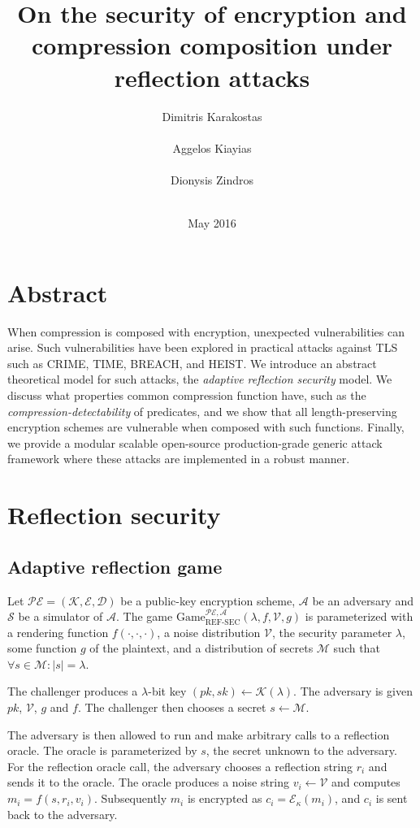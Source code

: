 \documentclass{sig-alternate-05-2015}
\title{On the security of encryption and compression composition under reflection attacks}
\author{
\alignauthor
Dimitris Karakostas\\
       \affaddr{University of Athens}\\
       \email{dimit.karakostas@gmail.com}
\alignauthor
Aggelos Kiayias\\
       \affaddr{University of Athens}\\
       \email{aggelos@di.uoa.gr}
\alignauthor
Dionysis Zindros\\
       \affaddr{University of Athens}\\
       \email{dionyziz@di.uoa.gr}
}
\date{May 2016}
\begin{document}
\maketitle

\section{Abstract}\label{sec:abstract}
When compression is composed with encryption, unexpected vulnerabilities can
arise. Such vulnerabilities have been explored in practical attacks against TLS
such as CRIME, TIME, BREACH, and HEIST. We introduce an abstract theoretical
model for such attacks, the \textit{adaptive reflection security} model. We
discuss what properties common compression function have, such as the
\textit{compression-detectability} of predicates, and we show that all
length-preserving encryption schemes are vulnerable when composed with such
functions. Finally, we provide a modular scalable open-source production-grade
generic attack framework where these attacks are implemented in a robust
manner.

\section{Reflection security}\label{sec:refsec}

\subsection{Adaptive reflection game}\label{subsec:refsecgame}

Let $\mathcal{PE} = (\mathcal{K}, \mathcal{E}, \mathcal{D})$ be a public-key
encryption scheme, $\mathcal{A}$ be an adversary and $\mathcal{S}$ be a
simulator of $\mathcal{A}$.  The game
$\text{Game}_{\text{REF-SEC}}^{\mathcal{PE},\mathcal{A}}(\lambda,  f,
\mathcal{V}, g)$ is parameterized with a rendering function $f(\cdot, \cdot,
\cdot)$, a noise distribution $\mathcal{V}$, the security parameter $\lambda$,
some function $g$ of the plaintext, and a distribution of secrets $\mathcal{M}$
such that $\forall s \in \mathcal{M}: |s| = \lambda$.

The challenger produces a $\lambda$-bit key $(pk, sk) \leftarrow
\mathcal{K}(\lambda)$. The adversary is given $pk$, $\mathcal{V}$, $g$ and $f$.
The challenger then chooses a secret $s \leftarrow \mathcal{M}$.

The adversary is then allowed to run and make arbitrary calls to a reflection
oracle. The oracle is parameterized by $s$, the secret unknown to the
adversary.  For the reflection oracle call, the adversary chooses a reflection
string $r_i$ and sends it to the oracle. The oracle produces a noise string
$v_i \leftarrow \mathcal{V}$ and computes $m_i = f(s, r_i, v_i)$.  Subsequently
$m_i$ is encrypted as $c_i = \mathcal{E}_\kappa(m_i)$, and $c_i$ is sent back
to the adversary.
\end{document}
